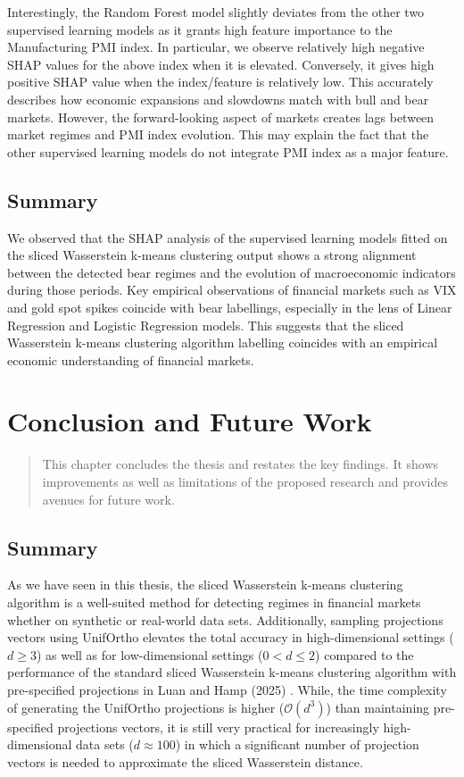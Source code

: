 \documentclass[12pt,a4paper]{report}
\begin{document}
Interestingly, the Random Forest model slightly deviates from the other two supervised learning models as it grants high feature importance to the Manufacturing PMI index.
In particular, we observe relatively high negative SHAP values for the above index when it is elevated. Conversely, it 
gives high positive SHAP value when the index/feature is relatively low. This accurately describes how economic expansions and slowdowns match with bull and bear markets. However, the forward-looking aspect of markets creates lags between market regimes and PMI index evolution. This may explain the fact that 
the other supervised learning models do not integrate PMI index as a major feature.


\section{Summary}
We observed that the SHAP analysis of the supervised learning models fitted on the sliced Wasserstein k-means clustering output shows a strong alignment between the detected bear regimes and the evolution of macroeconomic indicators during those periods.
Key empirical observations of financial markets such as VIX and gold spot spikes coincide with bear labellings, especially in the lens of Linear Regression and Logistic Regression models.
This suggests that the sliced Wasserstein k-means clustering algorithm labelling coincides with an empirical economic understanding of financial markets.

\chapter{Conclusion and Future Work}

\begin{quote}
  This chapter concludes the thesis and restates the key findings. It shows improvements as well as limitations of the proposed research and provides avenues for future work.
\end{quote}

\section{Summary}
As we have seen in this thesis, the sliced Wasserstein k-means clustering algorithm is a 
well-suited method for detecting regimes in financial markets whether on synthetic or real-world data sets.
Additionally, sampling projections vectors using UnifOrtho elevates the total accuracy in high-dimensional settings ($d\geq 3$) as well as for low-dimensional settings ($0<d\leq2$) compared to the performance
of the standard sliced Wasserstein k-means clustering algorithm with pre-specified projections in Luan and Hamp (2025) \cite{LuanHamp2025}.
While, the time complexity of generating the UnifOrtho projections is higher  ($\mathcal{O}(d^3)$) than maintaining pre-specified projections vectors, it is still very practical for increasingly high-dimensional data sets ($d\approx 100$) in which a significant number of projection vectors is needed to approximate the sliced Wasserstein distance.
\end{document}
